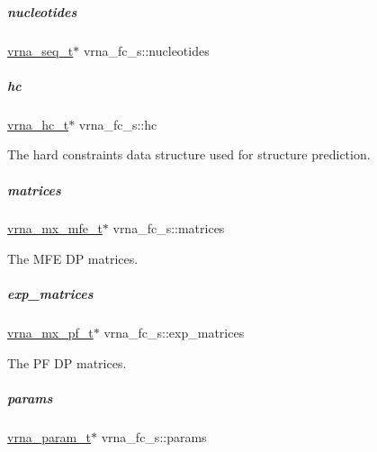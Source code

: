 \mbox{\label{group__fold__compound_a855b503aefd052430bf463d8518d2ff5}} 
\subparagraph{\texorpdfstring{nucleotides}{nucleotides}}
{\footnotesize\ttfamily \mbox{\hyperlink{sequence_8h_aa35bee3061759495467070b47d0e1f22}{vrna\+\_\+seq\+\_\+t}}$\ast$ vrna\+\_\+fc\+\_\+s\+::nucleotides}

\mbox{\label{group__fold__compound_aceaa904dbf50092d403ca99422e8f824}} 
\subparagraph{\texorpdfstring{hc}{hc}}
{\footnotesize\ttfamily \mbox{\hyperlink{group__hard__constraints_gac7e4c4f8abe3163a68110c5bff24e01d}{vrna\+\_\+hc\+\_\+t}}$\ast$ vrna\+\_\+fc\+\_\+s\+::hc}



The hard constraints data structure used for structure prediction. 

\mbox{\label{group__fold__compound_aca8be7bdc65bafe2172c6ee777f18568}} 
\subparagraph{\texorpdfstring{matrices}{matrices}}
{\footnotesize\ttfamily \mbox{\hyperlink{group__dp__matrices_gae5aef35d016475e758f619b7bcb534f9}{vrna\+\_\+mx\+\_\+mfe\+\_\+t}}$\ast$ vrna\+\_\+fc\+\_\+s\+::matrices}



The M\+FE DP matrices. 

\mbox{\label{group__fold__compound_afc38ed5a1028a2712d2365274bf49727}} 
\subparagraph{\texorpdfstring{exp\+\_\+matrices}{exp\_matrices}}
{\footnotesize\ttfamily \mbox{\hyperlink{group__dp__matrices_ga68729ab3fed26bdd1806fa814f172fc1}{vrna\+\_\+mx\+\_\+pf\+\_\+t}}$\ast$ vrna\+\_\+fc\+\_\+s\+::exp\+\_\+matrices}



The PF DP matrices. 

\mbox{\label{group__fold__compound_a19b8720c2c5321c1b97c830bd17566ea}} 
\subparagraph{\texorpdfstring{params}{params}}
{\footnotesize\ttfamily \mbox{\hyperlink{group__energy__parameters_ga8a69ca7d787e4fd6079914f5343a1f35}{vrna\+\_\+param\+\_\+t}}$\ast$ vrna\+\_\+fc\+\_\+s\+::params}



